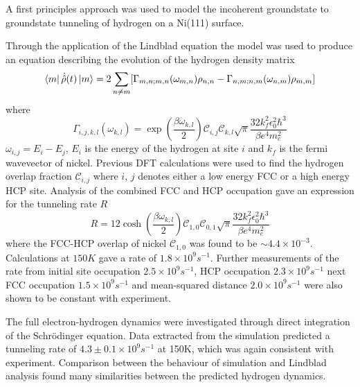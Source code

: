 A first principles
approach was used to
model the incoherent groundstate to
groundstate tunneling of
hydrogen on a Ni(111) surface. %

Through the application of the
Lindblad equation the model
was used to produce an
equation describing the
evolution of the
hydrogen density matrix
\begin{equation}
    \bra{m}\dot{\hat{\rho}}(t) \ket{m}  =
    2 \sum_{n\neq m}
    [  \Gamma_{m,n;m, n}(\omega_{m,n})\rho_{n, n}
        - \Gamma_{n,m;n, m}(\omega_{n,m})\rho_{m, m}]
\end{equation}
where
\begin{equation}
    \Gamma_{i,j, k,l}(\omega_{k,l})   =
    \exp{(\frac{\beta \omega_{k,l}}{2})}
    \mathcal{C}_{i,j} \mathcal{C}_{k,l}
    \sqrt{\pi} \frac{32 k_f^2 \epsilon_0^2 \hbar^3}{\beta e^4 m_e^2}
\end{equation}
\(\omega_{i,j} = E_i - E_j\),
\(E_i\) is the energy of the hydrogen at
site \(i\) and \(k_f\) is the fermi wavevector
of nickel. Previous DFT calculations
were used to find the hydrogen
overlap fraction
\(\mathcal{C}_{i,j}\) where
\(i\), \(j\) denotes either
a low energy FCC or a
high energy HCP site.
Analysis of the combined FCC and HCP
occupation gave an expression
for the tunneling rate \(R\)
\begin{equation}
    R   =
    12\cosh{(\frac{\beta \omega_{k,l}}{2})}
    \mathcal{C}_{1,0}\mathcal{C}_{0,1}
    \sqrt{\pi} \frac{32 k_f^2 \epsilon_0^2 \hbar^3}{\beta e^4 m_e^2}
\end{equation}
where the FCC-HCP
overlap of nickel
\(\mathcal{C}_{1,0}\)
was found to be \(\sim 4.4\times{}10^{-3}\).
Calculations at
\(150K\) gave a rate of
\(1.8\times 10^9s^{-1}\).
Further measurements of the
rate from initial site
occupation \(2.5\times 10^{9}s^{-1}\), HCP occupation
\(2.3\times 10^{9}s^{-1}\)
next FCC occupation
\(1.5\times 10^{9}s^{-1}\)
and mean-squared distance
\(2.0\times{} 10^9s^{-1}\)
were also shown to be constant
with experiment.

The full electron-hydrogen
dynamics were investigated
through direct integration
of the Schrödinger equation.
Data extracted from the simulation
predicted a tunneling rate of
\(4.3\pm 0.1\times10^{9}s^{-1}\)
at 150K,
which was again
consistent with
experiment. Comparison
between the behaviour
of simulation
and Lindblad analysis
found many similarities
between the
predicted
hydrogen dynamics.
